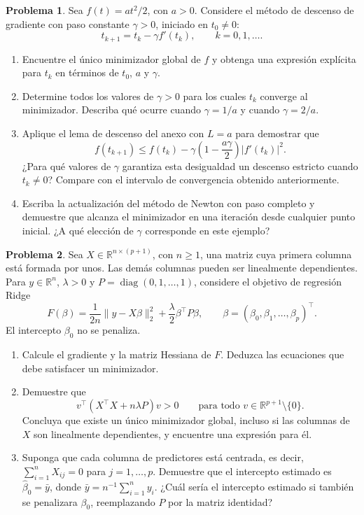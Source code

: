 \documentclass[a4paper,12 pt]{article}
\theoremstyle{definition}
\newtheorem{problema}{Problema}
\newcommand{\R}{\mathbb{R}}
\begin{document}
\begin{problema}
Sea $f(t)=at^2/2$, con $a>0$. Considere el método de descenso de gradiente con paso constante $\gamma>0$, iniciado en $t_0\neq0$:
\[
t_{k+1}=t_k-\gamma f'(t_k),\qquad k=0,1,\ldots.
\]

\begin{enumerate}
	\item Encuentre el único minimizador global de $f$ y obtenga una expresión explícita para $t_k$ en términos de $t_0$, $a$ y $\gamma$.
	\item Determine todos los valores de $\gamma>0$ para los cuales $t_k$ converge al minimizador. Describa qué ocurre cuando $\gamma=1/a$ y cuando $\gamma=2/a$.
	\item Aplique el lema de descenso del anexo con $L=a$ para demostrar que
	\[
	f(t_{k+1})\leq f(t_k)-\gamma\left(1-\frac{a\gamma}{2}\right)|f'(t_k)|^2.
	\]
	¿Para qué valores de $\gamma$ garantiza esta desigualdad un descenso estricto cuando $t_k\neq0$? Compare con el intervalo de convergencia obtenido anteriormente.
	\item Escriba la actualización del método de Newton con paso completo y demuestre que alcanza el minimizador en una iteración desde cualquier punto inicial. ¿A qué elección de $\gamma$ corresponde en este ejemplo?
\end{enumerate}
\end{problema}

\begin{problema}
Sea $X\in\R^{n\times(p+1)}$, con $n\geq1$, una matriz cuya primera columna está formada por unos. Las demás columnas pueden ser linealmente dependientes. Para $y\in\R^n$, $\lambda>0$ y $P=\operatorname{diag}(0,1,\ldots,1)$, considere el objetivo de regresión Ridge
\[
F(\beta)=\frac{1}{2n}\|y-X\beta\|_2^2+\frac{\lambda}{2}\beta^\top P\beta,
\qquad \beta=(\beta_0,\beta_1,\ldots,\beta_p)^\top.
\]
El intercepto $\beta_0$ no se penaliza.

\begin{enumerate}
	\item Calcule el gradiente y la matriz Hessiana de $F$. Deduzca las ecuaciones que debe satisfacer un minimizador.
	\item Demuestre que
	\[
	v^\top(X^\top X+n\lambda P)v>0\qquad\text{para todo }v\in\R^{p+1}\setminus\{0\}.
	\]
	Concluya que existe un único minimizador global, incluso si las columnas de $X$ son linealmente dependientes, y encuentre una expresión para él.
	\item Suponga que cada columna de predictores está centrada, es decir, $\sum_{i=1}^n X_{ij}=0$ para $j=1,\ldots,p$. Demuestre que el intercepto estimado es $\widehat\beta_0=\bar y$, donde $\bar y=n^{-1}\sum_{i=1}^n y_i$. ¿Cuál sería el intercepto estimado si también se penalizara $\beta_0$, reemplazando $P$ por la matriz identidad?
\end{enumerate}
\end{problema}
\end{document}
